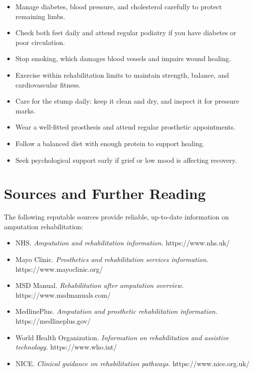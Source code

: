 \begin{itemize}
    \item Manage diabetes, blood pressure, and cholesterol carefully to protect remaining limbs.
    \item Check both feet daily and attend regular podiatry if you have diabetes or poor circulation.
    \item Stop smoking, which damages blood vessels and impairs wound healing.
    \item Exercise within rehabilitation limits to maintain strength, balance, and cardiovascular fitness.
    \item Care for the stump daily: keep it clean and dry, and inspect it for pressure marks.
    \item Wear a well-fitted prosthesis and attend regular prosthetic appointments.
    \item Follow a balanced diet with enough protein to support healing.
    \item Seek psychological support early if grief or low mood is affecting recovery.
\end{itemize}

\section*{Sources and Further Reading}
The following reputable sources provide reliable, up-to-date information on amputation rehabilitation:

\begin{itemize}
    \item NHS. \textit{Amputation and rehabilitation information.} https://www.nhs.uk/
    \item Mayo Clinic. \textit{Prosthetics and rehabilitation services information.} https://www.mayoclinic.org/
    \item MSD Manual. \textit{Rehabilitation after amputation overview.} https://www.msdmanuals.com/
    \item MedlinePlus. \textit{Amputation and prosthetic rehabilitation information.} https://medlineplus.gov/
    \item World Health Organization. \textit{Information on rehabilitation and assistive technology.} https://www.who.int/
    \item NICE. \textit{Clinical guidance on rehabilitation pathways.} https://www.nice.org.uk/
\end{itemize}
